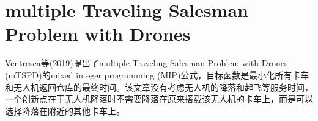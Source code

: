 \chapter{multiple Traveling Salesman Problem with Drones}
Ventresca等(2019)\cite{kitjacharoenchaiMultipleTravelingSalesman2019}提出了multiple Traveling Salesman Problem with Drones (mTSPD)的mixed integer programming (MIP)公式，目标函数是最小化所有卡车和无人机返回仓库的最终时间。该文章没有考虑无人机的降落和起飞等服务时间，一个创新点在于无人机降落时不需要降落在原来搭载该无人机的卡车上，而是可以选择降落在附近的其他卡车上。
